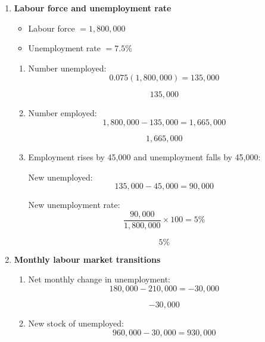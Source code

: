 \documentclass[12pt]{article}
\begin{document}
\begin{enumerate}[label=\textbf{Question \arabic*.}]
\begin{enumerate}[label=(\alph*)]
    \item Employment rate:
    \[
    \frac{1{,}560{,}000}{2{,}400{,}000}\times 100 = 65\%
    \]

    \[
    \boxed{65\%}
    \]
\end{enumerate}


\item \textbf{Labour force and unemployment rate}

\begin{itemize}
    \item Labour force \(=1{,}800{,}000\)
    \item Unemployment rate \(=7.5\%\)
\end{itemize}

\begin{enumerate}[label=(\alph*)]
    \item Number unemployed:
    \[
    0.075(1{,}800{,}000)=135{,}000
    \]

    \[
    \boxed{135{,}000}
    \]

    \item Number employed:
    \[
    1{,}800{,}000-135{,}000=1{,}665{,}000
    \]

    \[
    \boxed{1{,}665{,}000}
    \]

    \item Employment rises by 45{,}000 and unemployment falls by 45{,}000:

    New unemployed:
    \[
    135{,}000-45{,}000=90{,}000
    \]

    New unemployment rate:
    \[
    \frac{90{,}000}{1{,}800{,}000}\times 100 = 5\%
    \]

    \[
    \boxed{5\%}
    \]
\end{enumerate}


\item \textbf{Monthly labour market transitions}

\begin{enumerate}[label=(\alph*)]
    \item Net monthly change in unemployment:
    \[
    180{,}000 - 210{,}000 = -30{,}000
    \]

    \[
    \boxed{-30{,}000}
    \]

    \item New stock of unemployed:
    \[
    960{,}000 - 30{,}000 = 930{,}000
    \]


\end{enumerate}
\end{enumerate}
\end{document}
